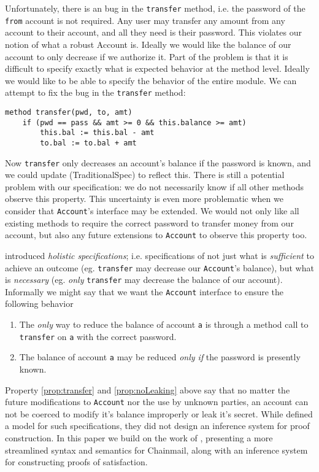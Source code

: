 \documentclass[acmsmall,review,anonymous]{acmart}\settopmatter{printfolios=true,printccs=false,printacmref=false}
\begin{document}
Unfortunately, there is an bug in the \texttt{transfer} method, 
i.e. the password of the \texttt{from} account is not required. Any user may transfer any amount 
from any account to their account, and all they need is their password. This violates our notion 
of what a robust Account is. Ideally we would like the balance of our account to only decrease 
if we authorize it.
Part of the problem is that 
it is difficult to specify exactly what is expected behavior at the method level. Ideally 
we would like to be able to specify the behavior of the entire module. We can attempt to 
fix the bug in the \texttt{transfer} method:
\begin{lstlisting}[mathescape=true]
method transfer(pwd, to, amt)
	if (pwd == pass && amt >= 0 && this.balance >= amt)
		this.bal := this.bal - amt
		to.bal := to.bal + amt
\end{lstlisting}
Now \texttt{transfer} only decreases an account's balance if the password is known, and
we could update (TraditionalSpec) to reflect this. There is still a potential problem 
with our specification: we do not necessarily know if all other methods observe this
property. This uncertainty is even more problematic when we consider that \texttt{Account}'s
interface may be extended. We would not only like all existing methods to require 
the correct password to transfer money from our account, but also any future extensions
to \texttt{Account} to observe this property too.

\citeauthor{FASE} introduced \emph{holistic specifications}; i.e. specifications of
not just what is \emph{sufficient} to achieve an outcome (eg. \texttt{transfer} may 
decrease our \texttt{Account}'s balance), but what is \emph{necessary} (eg. \emph{only} 
\texttt{transfer} may decrease the balance of our account). Informally we might say 
that we want the \texttt{Account} interface to ensure the following behavior
\begin{enumerate}
\item
\label{prop:transfer}
The \emph{only} way to reduce the balance of account \texttt{a} is through a method call
to \texttt{transfer} on \texttt{a} with the correct password.
\item
\label{prop:noLeaking}
The balance of account \texttt{a} may be reduced \emph{only if} the password is presently
known.
\end{enumerate}
Property \ref{prop:transfer} and \ref{prop:noLeaking} above say that no matter the 
future modifications to \texttt{Account} nor the use by unknown parties, an account 
can not be coerced to modify it's balance improperly or leak it's secret. While 
\citeauthor{FASE} defined a model for such specifications, they did not design an
inference system for proof construction. In this paper we build on the work of 
\citeauthor{FASE}, presenting a more streamlined syntax and semantics for Chainmail, 
along with an inference system for constructing proofs of satisfaction. 
\end{document}
